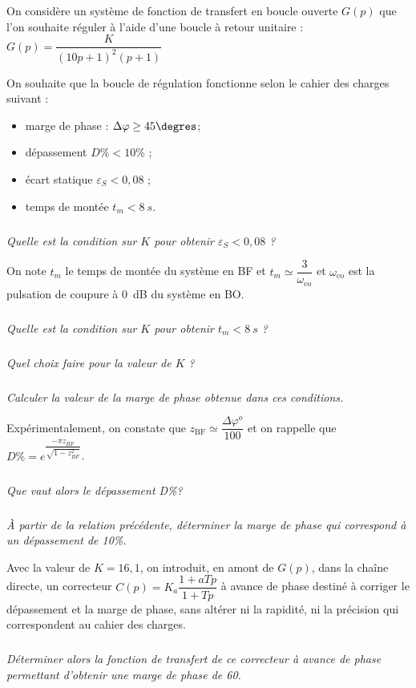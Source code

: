 \documentclass[10pt,fleqn]{article} %
\begin{document}

\vspace{5cm}
\pagestyle{fancy}
\thispagestyle{plain}

\def\columnseprulecolor{\color{ocre}}
\setlength{\columnseprule}{0.4pt} 

\def\pathfig{images}

\begin{multicols}{2}
On considère un système de fonction de transfert en boucle ouverte $G(p)$ que l'on souhaite réguler à l’aide d'une boucle à retour unitaire : $G(p)=\dfrac{K}{\left(10p+1 \right)^2\left(p+1 \right)}$

On souhaite que la boucle de régulation fonctionne selon le cahier des charges suivant :
\begin{itemize}
\item marge de phase : $\Delta \varphi \geq 45\degres$;
\item dépassement $D\% < 10\%$ ; 
\item écart statique $\varepsilon_S < 0,08$ ; 
\item temps de montée $t_m < \SI{8}{s}$.
\end{itemize}

\subparagraph{}
\textit{Quelle est la condition sur $K$ pour obtenir $\varepsilon_S<0,08$ ?}

On note $t_m$ le temps de montée du système en BF et $t_m\simeq \dfrac{3}{\omega_{\text{co}}}$ et $\omega_{\text{co}}$ est la pulsation de coupure à \SI{0}{dB} du système en BO.  

\subparagraph{}
\textit{Quelle est la condition sur $K$ pour obtenir $t_m<\SI{8}{s}$ ?}


\subparagraph{}
\textit{Quel choix faire pour la valeur de $K$ ?}

\subparagraph{}
\textit{Calculer la valeur de la marge de phase obtenue dans ces conditions. }


Expérimentalement, on constate que 
$z_{\text{BF}}\simeq \dfrac{\Delta \varphi ^{o}}{100}$ 
et on rappelle que $D\% = e^{\dfrac{-\pi z_{BF}}{\sqrt{1-z_{BF}^2}}}$.

\subparagraph{}
\textit{Que vaut alors le dépassement D\%?}


\subparagraph{}
\textit{À partir de la relation précédente, déterminer la marge de phase qui correspond à un dépassement de 10\%.}

Avec la valeur de $K=16,1$, on introduit, en amont de $G(p)$, dans la chaîne directe, un correcteur $C(p)=K_a \dfrac{1+aTp}{1+Tp}$ à avance de phase destiné à corriger le dépassement et la marge de phase, sans altérer ni la rapidité, ni la précision qui correspondent au cahier des charges.

\subparagraph{}
\textit{Déterminer alors la fonction de transfert de ce correcteur à avance de phase permettant d’obtenir une marge de phase de 60\degres.}

\end{multicols}
\end{document}
